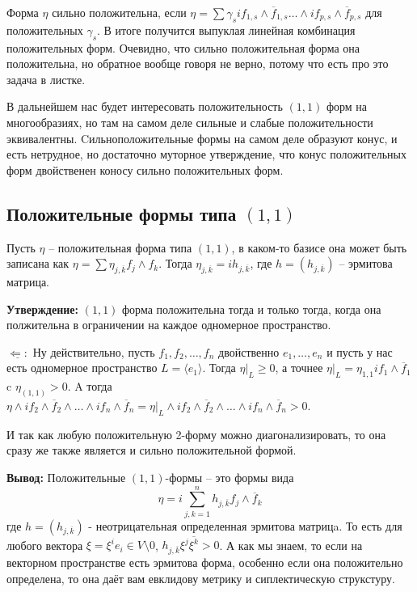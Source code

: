 \documentclass[a4paper, 12pt, oneside]{book}
\begin{document}
Форма $\eta$ сильно положительна, если $\eta=\sum\gamma_sif_{1,s}\wedge \overline f_{1,s}\ldots
\wedge if_{p,s}\wedge\overline f_{p,s}$ для положительных $\gamma_s$. В итоге 
получится выпуклая линейная комбинация положительных форм. Очевидно, что сильно
положительная форма она положительна, но обратное вообще говоря не верно,
потому что есть про это задача в листке.

В дальнейшем нас будет интересовать положительность $(1,1)$ форм на многообразиях,
но там на самом деле сильные и слабые положительности эквивалентны.
Cильноположительные формы на самом деле образуют конус, и есть нетрудное, но
достаточно муторное утверждение, что конус положительных форм двойственен коносу
сильно положительных форм.

\subsection{Положительные формы типа $(1,1)$}
Пусть $\eta$ – положительная форма типа $(1,1)$, в каком-то базисе она может
быть записана как $\eta = \sum \eta_{j,\overline k} f_j\wedge f_k$. Тогда
$\eta_{j,\overline k}=ih_{j,\overline k}$, где $h=(h_{j,\overline k})$ – эрмитова
матрица.

\textbf{Утверждение:} $(1,1)$ форма положительна тогда и только тогда, когда
она полжительна в ограничении на каждое одномерное пространство.

$\underline{\Leftarrow:}$ Ну действительно, пусть $f_1, f_2,\ldots,f_n$
двойственно $e_1,\ldots,e_n$ и пусть у нас есть одномерное пространство
$L=\langle e_1\rangle$. Тогда $\eta|_L\geq 0$, а точнее $\eta|_L=\eta_{1,1}if_1
\wedge \overline f_1$ c $\eta_(1,1)>0$. A тогда $\eta \wedge if_2\wedge\overline f_2\wedge\ldots
\wedge if_n\wedge\overline f_n=\eta|_L \wedge if_2\wedge\overline f_2\wedge\ldots
\wedge if_n\wedge\overline f_n>0$.

И так как любую положительную 2-форму можно диагонализировать, то она сразу же
также является и сильно положительной формой.

\textbf{Вывод:} Положительные $(1,1)$-формы – это формы вида 
\[\eta=i\sum_{j,k=1}^nh_{j,\overline k}f_j\wedge\overline f_k\]
где $h=(h_{j,\overline k})$ - неотрицательная определенная эрмитова матрицa. То
есть для любого вектора $\xi=\xi^i e_i\in V\setminus{0}$, $h_{j,\overline k}\xi^j\overline{\xi^k}
>0$. А как мы знаем, то если на векторном пространстве есть эрмитова форма,
особенно если она положительно определена, то она даёт вам евклидову метрику и
сиплектическую струкстуру.
\end{document}
